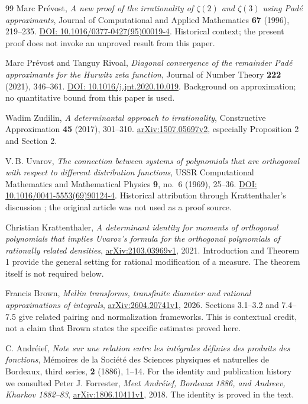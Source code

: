 \begin{thebibliography}{99}
Marc Pr\'evost,
\emph{A new proof of the irrationality of \(\zeta(2)\) and \(\zeta(3)\)
using Pad\'e approximants},
Journal of Computational and Applied Mathematics \textbf{67} (1996),
219--235.
\href{https://doi.org/10.1016/0377-0427(95)00019-4}{DOI: 10.1016/0377-0427(95)00019-4}.
Historical context; the present proof does not invoke an unproved
result from this paper.

Marc Pr\'evost and Tanguy Rivoal,
\emph{Diagonal convergence of the remainder Pad\'e approximants for the
Hurwitz zeta function},
Journal of Number Theory \textbf{222} (2021), 346--361.
\href{https://doi.org/10.1016/j.jnt.2020.10.019}{DOI: 10.1016/j.jnt.2020.10.019}.
Background on approximation; no quantitative bound from this paper is used.

Wadim Zudilin,
\emph{A determinantal approach to irrationality},
Constructive Approximation \textbf{45} (2017), 301--310.
\href{https://arxiv.org/pdf/1507.05697v2}{arXiv:1507.05697v2},
especially Proposition 2 and Section 2.

V.\,B. Uvarov,
\emph{The connection between systems of polynomials that are orthogonal
with respect to different distribution functions},
USSR Computational Mathematics and Mathematical Physics
\textbf{9}, no.\ 6 (1969), 25--36.
\href{https://doi.org/10.1016/0041-5553(69)90124-4}{DOI: 10.1016/0041-5553(69)90124-4}.
Historical attribution through Krattenthaler's discussion \cite{krattenthaler};
the original article was not used as a proof source.

Christian Krattenthaler,
\emph{A determinant identity for moments of orthogonal polynomials that
implies Uvarov's formula for the orthogonal polynomials of rationally
related densities},
\href{https://arxiv.org/pdf/2103.03969v1}{arXiv:2103.03969v1}, 2021.
Introduction and Theorem 1 provide the general setting for rational
modification of a measure. The theorem itself is not required below.

Francis Brown,
\emph{Mellin transforms, transfinite diameter and rational approximations
of integrals},
\href{https://arxiv.org/html/2604.20741v1}{arXiv:2604.20741v1}, 2026.
Sections 3.1--3.2 and 7.4--7.5 give related pairing and normalization
frameworks. This is contextual credit, not a claim that Brown states
the specific estimates proved here.

C. Andr\'eief,
\emph{Note sur une relation entre les int\'egrales d\'efinies des produits
des fonctions}, M\'emoires de la Soci\'et\'e des Sciences physiques et
naturelles de Bordeaux, third series, \textbf{2} (1886), 1--14.
For the identity and publication history we consulted Peter J. Forrester,
\emph{Meet Andr\'eief, Bordeaux 1886, and Andreev, Kharkov 1882--83},
\href{https://arxiv.org/pdf/1806.10411v1}{arXiv:1806.10411v1}, 2018.
The identity is proved in the text.


\end{thebibliography}
